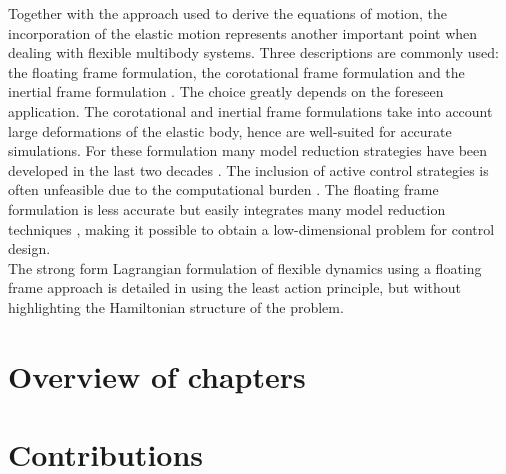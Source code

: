 \indent Together with the approach used to derive the equations of motion, the incorporation of the elastic motion represents another important point when dealing with flexible multibody systems. Three descriptions are commonly used: the floating frame formulation, the corotational frame formulation and the inertial frame formulation \cite{ellenbroek2018}. The choice greatly depends on the foreseen application.  The corotational and inertial frame formulations take into account large deformations of the elastic body, hence are well-suited for accurate simulations. For these formulation many model reduction strategies have been developed in the last two decades \cite{rong2019}. The inclusion of active control strategies is often unfeasible due to the computational burden \cite{wasfy2003survey}. The floating frame formulation is less accurate but easily integrates many model reduction techniques \cite{nowakowski2012}, making it possible to obtain a low-dimensional problem for control design. \\

The strong form Lagrangian formulation of flexible dynamics using a floating frame approach is detailed in  \cite[Eq. 4.10]{simeon2013computational} using the least action principle, but without highlighting the Hamiltonian structure of the problem. 

\section{Overview of chapters}


\section{Contributions}